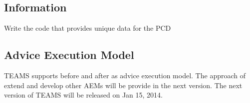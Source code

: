 \documentclass{report}
\begin{document}
\subsection{Information} 
Write the code that provides unique data for the PCD
\subsection{Advice Execution Model}
T{\small EAMS} supports before and after as advice execution model. The approach of extend and develop other AEMs will be provide in the next version. The next version of T{\small EAMS} will be released on Jan 15, 2014. 
\end{document}
